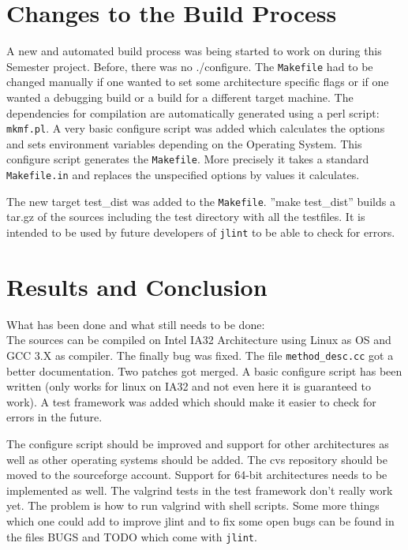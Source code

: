 \documentclass[11pt,twoside,a4paper,draft]{article}
\begin{document}
\section {Changes to the Build Process}

A new and automated build process was being started to work on during this 
Semester project. Before, there was no ./configure. The \texttt{Makefile} had
to be changed
manually if one wanted to set some architecture specific flags or if one wanted
a debugging build or a build for a different target machine. The dependencies 
for compilation are automatically generated using a perl script: 
\texttt{mkmf.pl}. A very basic configure script was added which calculates the
options and sets environment variables depending on the Operating System. This
configure script generates the \texttt{Makefile}. More precisely it takes a 
standard \texttt{Makefile.in} and replaces the unspecified options by values 
it calculates.

The new target test\_dist was added to the \texttt{Makefile}. 
''make test\_dist'' builds a tar.gz of the sources including the test 
directory with all the testfiles. It is intended to be used by future 
developers of \texttt{jlint} to be able to check for errors.

\section {Results and Conclusion}

What has been done and what still needs to be done:
\\
The sources can be compiled on Intel IA32 Architecture using Linux as OS and
GCC 3.X as compiler. The finally bug was fixed. The file 
\texttt{method\_desc.cc} got a better documentation. Two patches got merged.
A basic configure script has been written (only works for linux on IA32 and 
not even here it is guaranteed to work). A test framework was added which 
should make it easier to check for errors in the future.

The configure script should be improved and support for other architectures as
well as other operating systems should be added. The cvs repository should be
moved to the sourceforge account. Support for 64-bit architectures needs to be implemented as well. The valgrind tests in the test framework
don't really work yet. The problem is how to run valgrind with shell scripts.
Some more things which one could add to improve jlint and to fix some open bugs
can be found in the files BUGS and TODO which come with \texttt{jlint}.
\end{document}
